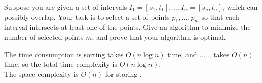 \problem{}
Suppose you are given a set of intervals $I_1 = [s_1, t_1], \ldots, I_n = [s_n, t_n]$, which can possibly overlap.  Your task is to select a set of points $p_1, \ldots, p_m$ so that each interval intersects at least one of the points.  Give an algorithm to minimize the number of selected points $m$, and prove that your algorithm is optimal.

\solution{}













The time consumption is sorting takes $O(n\log n)$ time, and ...... takes $O(n)$ time,
so the total time complexity is $O(n\log n)$.\\
The space complexity is $O(n)$ for storing  .\\

\newpage